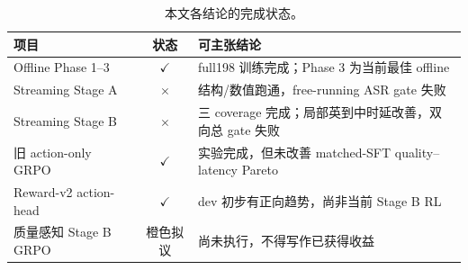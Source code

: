 \documentclass[11pt,a4paper]{article}
\newcommand{\checked}{\textcolor{streamgreen}{\ensuremath{\checkmark}}}
\newcommand{\failed}{\textcolor{red!70!black}{\ensuremath{\times}}}
\begin{document}
\begin{table}[H]
\centering
\caption{本文各结论的完成状态。}
\begin{tabularx}{\textwidth}{lCY}
\toprule
项目 & 状态 & 可主张结论 \\
\midrule
Offline Phase 1--3 & \checked & full198 训练完成；Phase 3 为当前最佳 offline \\
Streaming Stage A & \failed & 结构/数值跑通，free-running ASR gate 失败 \\
Streaming Stage B & \failed & 三 coverage 完成；局部英到中时延改善，双向总 gate 失败 \\
旧 action-only GRPO & \checked & 实验完成，但未改善 matched-SFT quality--latency Pareto \\
Reward-v2 action-head & \checked & dev 初步有正向趋势，尚非当前 Stage B RL \\
质量感知 Stage B GRPO & 橙色拟议 & 尚未执行，不得写作已获得收益 \\
\bottomrule
\end{tabularx}
\end{table}



\end{document}
